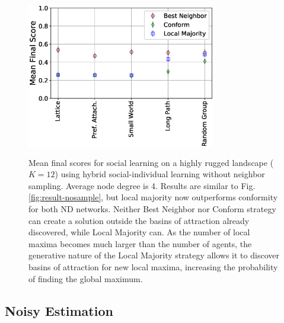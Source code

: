 \begin{figure}
    \centering
    \includegraphics[width=3.25in,height=2.75in]{fig-performance-complex.eps}
    \caption{Mean final scores for social learning on a highly rugged landscape ($K=12$) using hybrid social-individual learning without neighbor sampling. Average node degree is 4. Results are similar to Fig. \ref{fig:result-nosample}, but local majority now outperforms conformity for both ND networks. Neither Best Neighbor nor Conform strategy can create a solution outside the basins of attraction already discovered, while Local Majority can. As the number of local maxima becomes much larger than the number of agents, the generative nature of the Local Majority strategy allows it to discover basins of attraction for new local maxima, increasing the probability of finding the global maximum.}
    \label{fig:result-complex}
\end{figure}

\subsection{Noisy Estimation}

